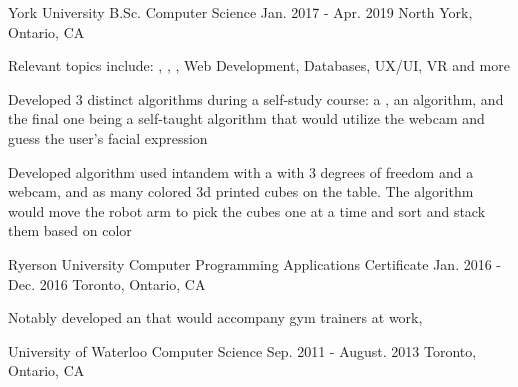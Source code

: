 

\begin{cventries}

  \cventry
    {York University} %
    {B.Sc. Computer Science} %
    {Jan. 2017 - Apr. 2019} %
    {North York, Ontario, CA} %
    {
      \begin{cvitems} %
        \item {Relevant topics include: , , , Web Development, Databases, UX/UI, VR and more}
        \item {Developed 3 distinct  algorithms during a self-study course: a , an  algorithm, and the final one being a self-taught  algorithm that would utilize the webcam and guess the user's facial expression}
        \item {Developed algorithm used intandem with a  with 3 degrees of freedom and a webcam, and as many colored 3d printed cubes on the table. The algorithm would move the robot arm to pick the cubes one at a time and sort and stack them based on color}
      \end{cvitems}
    }


  \cventry
  {Ryerson University} %
  {Computer Programming Applications Certificate} %
  {Jan. 2016 - Dec. 2016} %
  {Toronto, Ontario, CA} %
  {
    \begin{cvitems} %
      \item {Notably developed an  that would accompany gym trainers at work, }
    \end{cvitems}
  }

\cventry
{University of Waterloo} %
{Computer Science} %
{Sep. 2011 - August. 2013} %
{Toronto, Ontario, CA} %
{
}


\end{cventries}